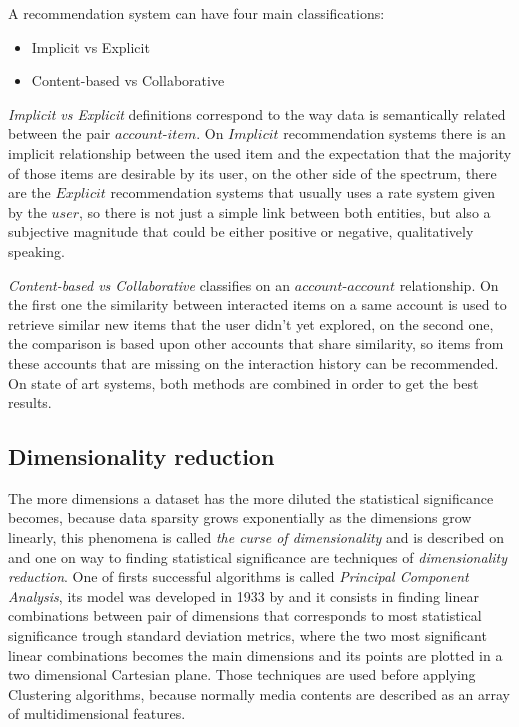 \documentclass[ecp,tc,english]{iiufrgs}
\begin{document}
        A recommendation system can have four main classifications:
        \begin{itemize} 
            \item Implicit vs Explicit
            \item Content-based vs Collaborative
        \end{itemize}

        \textit{Implicit vs Explicit} definitions correspond to the way data is semantically related between the pair \(account\)-\(item\). On \(Implicit\) recommendation systems there is an implicit relationship between the used item and the expectation that the majority of those items are desirable by its user, on the other side of the spectrum, there are the \(Explicit\) recommendation systems that usually uses a rate system given by the \(user\), so there is not just a simple link between both entities, but also a subjective magnitude that could be either positive or negative, qualitatively speaking.

        \textit{Content-based vs Collaborative} classifies on an \(account\)-\(account\) relationship. On the first one the similarity between interacted items on a same account is used to retrieve similar new items that the user didn't yet explored, on the second one, the comparison is based upon other accounts that share similarity, so items from these accounts that are missing on the interaction history can be recommended. On state of art systems, both methods are combined in order to get the best results.    

        \subsection{Dimensionality reduction}
        The more dimensions a dataset has the more diluted the statistical significance becomes, 
        because data sparsity grows exponentially as the dimensions grow linearly, 
        this phenomena is called \textit{the curse of dimensionality} and is described on \cite{10.1093/imamat/24.1.59} and one on way to finding statistical significance are techniques of \textit{dimensionality reduction}.
        One of firsts successful algorithms is called \textit{Principal Component Analysis}, 
        its model was developed in 1933 by \cite{hotelling:33} and it consists in finding linear combinations between pair of dimensions that corresponds to most statistical significance trough standard deviation metrics, where the two most significant linear combinations becomes the main dimensions and its points are plotted in a two dimensional Cartesian plane.
        Those techniques are used before applying Clustering algorithms, because normally media contents are described as an array of multidimensional features. 
        
\end{document}
